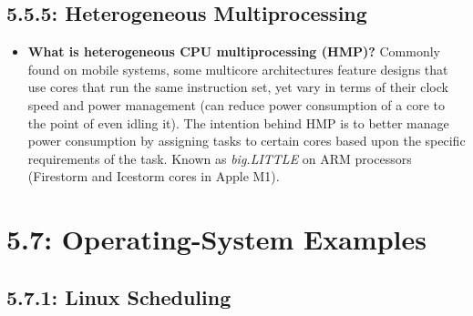 \documentclass[12pt]{article}
\begin{document}
\subsection*{5.5.5: Heterogeneous Multiprocessing}

\begin{itemize}
    \item \textbf{What is heterogeneous CPU multiprocessing (HMP)?} Commonly found on mobile systems, some multicore architectures feature designs that use cores that run the same instruction set, yet vary in terms of their clock speed and power management (can reduce power consumption of a core to the point of even idling it). The intention behind HMP is to better manage power consumption by assigning tasks to certain cores based upon the specific requirements of the task. Known as \textit{big.LITTLE} on ARM processors (Firestorm and Icestorm cores in Apple M1).
\end{itemize}

\section*{5.7: Operating-System Examples}

\subsection*{5.7.1: Linux Scheduling}
\end{document}
